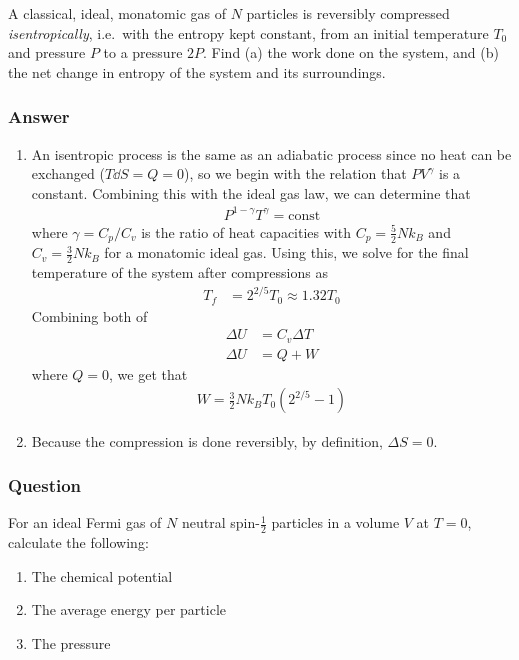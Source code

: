 A classical, ideal, monatomic gas of $N$ particles is reversibly compressed
\emph{isentropically}, i.e.~with the entropy kept constant, from an initial
temperature $T_0$ and pressure $P$ to a pressure $2P$. Find (a) the work done
on the system, and (b) the net change in entropy of the system and its
surroundings.

\subsubsection{Answer}
\begin{enumerate}
	\item
		An isentropic process is the same as an adiabatic process since no
		heat can be exchanged ($T\dd S = Q = 0$), so we begin with the relation
		that $PV^{\gamma }$ is a constant. Combining this with the ideal gas law,
		we can determine that
		\begin{align*}
			P^{1-\gamma }T^{\gamma } = \mathrm{const}
		\end{align*}
		where $\gamma  = C_p/C_v$ is the ratio of heat capacities with $C_p =
		\frac 52 Nk_B$ and $C_v = \frac 32 Nk_B$ for a monatomic ideal gas.
		Using this, we solve for the final temperature of the system after
		compressions as
		\begin{align*}
			T_f &= 2^{2/5} T_0 \approx 1.32T_0
		\end{align*}
		Combining both of
		\begin{align*}
			\Delta U &= C_v \Delta T \\
			\Delta U &= Q + W
		\end{align*}
		where $Q = 0$, we get that
		\begin{align}
			\boxed{
			W = \frac 32 Nk_B T_0 (2^{2/5} - 1)
			}
		\end{align}
	\item
		Because the compression is done reversibly, by definition, $\Delta S = 0$.
\end{enumerate}

\subsubsection{Question}

For an ideal Fermi gas of $N$ neutral spin-$\frac 12$ particles in a volume
$V$ at $T = 0$, calculate the following:
\begin{enumerate}
	\item The chemical potential
	\item The average energy per particle
	\item The pressure
\end{enumerate}


